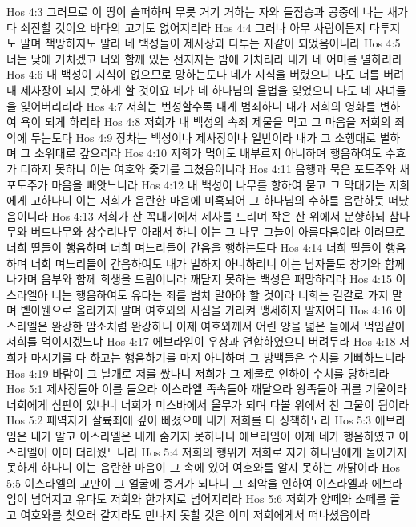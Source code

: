 Hos 4:3  그러므로 이 땅이 슬퍼하며 무릇 거기 거하는 자와 들짐승과 공중에 나는 새가 다 쇠잔할 것이요 바다의 고기도 없어지리라
Hos 4:4  그러나 아무 사람이든지 다투지도 말며 책망하지도 말라 네 백성들이 제사장과 다투는 자같이 되었음이니라
Hos 4:5  너는 낮에 거치겠고 너와 함께 있는 선지자는 밤에 거치리라 내가 네 어미를 멸하리라
Hos 4:6  내 백성이 지식이 없으므로 망하는도다 네가 지식을 버렸으니 나도 너를 버려 내 제사장이 되지 못하게 할 것이요 네가 네 하나님의 율법을 잊었으니 나도 네 자녀들을 잊어버리리라
Hos 4:7  저희는 번성할수록 내게 범죄하니 내가 저희의 영화를 변하여 욕이 되게 하리라
Hos 4:8  저희가 내 백성의 속죄 제물을 먹고 그 마음을 저희의 죄악에 두는도다
Hos 4:9  장차는 백성이나 제사장이나 일반이라 내가 그 소행대로 벌하며 그 소위대로 갚으리라
Hos 4:10  저희가 먹어도 배부르지 아니하며 행음하여도 수효가 더하지 못하니 이는 여호와 좇기를 그쳤음이니라
Hos 4:11  음행과 묵은 포도주와 새 포도주가 마음을 빼앗느니라
Hos 4:12  내 백성이 나무를 향하여 묻고 그 막대기는 저희에게 고하나니 이는 저희가 음란한 마음에 미혹되어 그 하나님의 수하를 음란하듯 떠났음이니라
Hos 4:13  저희가 산 꼭대기에서 제사를 드리며 작은 산 위에서 분향하되 참나무와 버드나무와 상수리나무 아래서 하니 이는 그 나무 그늘이 아름다움이라 이러므로 너희 딸들이 행음하며 너희 며느리들이 간음을 행하는도다
Hos 4:14  너희 딸들이 행음하며 너희 며느리들이 간음하여도 내가 벌하지 아니하리니 이는 남자들도 창기와 함께 나가며 음부와 함께 희생을 드림이니라 깨닫지 못하는 백성은 패망하리라
Hos 4:15  이스라엘아 너는 행음하여도 유다는 죄를 범치 말아야 할 것이라 너희는 길갈로 가지 말며 벧아웬으로 올라가지 말며 여호와의 사심을 가리켜 맹세하지 말지어다
Hos 4:16  이스라엘은 완강한 암소처럼 완강하니 이제 여호와께서 어린 양을 넓은 들에서 먹임같이 저희를 먹이시겠느냐
Hos 4:17  에브라임이 우상과 연합하였으니 버려두라
Hos 4:18  저희가 마시기를 다 하고는 행음하기를 마지 아니하며 그 방백들은 수치를 기뻐하느니라
Hos 4:19  바람이 그 날개로 저를 쌌나니 저희가 그 제물로 인하여 수치를 당하리라
Hos 5:1  제사장들아 이를 들으라 이스라엘 족속들아 깨달으라 왕족들아 귀를 기울이라 너희에게 심판이 있나니 너희가 미스바에서 올무가 되며 다볼 위에서 친 그물이 됨이라
Hos 5:2  패역자가 살륙죄에 깊이 빠졌으매 내가 저희를 다 징책하노라
Hos 5:3  에브라임은 내가 알고 이스라엘은 내게 숨기지 못하나니 에브라임아 이제 네가 행음하였고 이스라엘이 이미 더러웠느니라
Hos 5:4  저희의 행위가 저희로 자기 하나님에게 돌아가지 못하게 하나니 이는 음란한 마음이 그 속에 있어 여호와를 알지 못하는 까닭이라
Hos 5:5  이스라엘의 교만이 그 얼굴에 증거가 되나니 그 죄악을 인하여 이스라엘과 에브라임이 넘어지고 유다도 저희와 한가지로 넘어지리라
Hos 5:6  저희가 양떼와 소떼를 끌고 여호와를 찾으러 갈지라도 만나지 못할 것은 이미 저희에게서 떠나셨음이라
